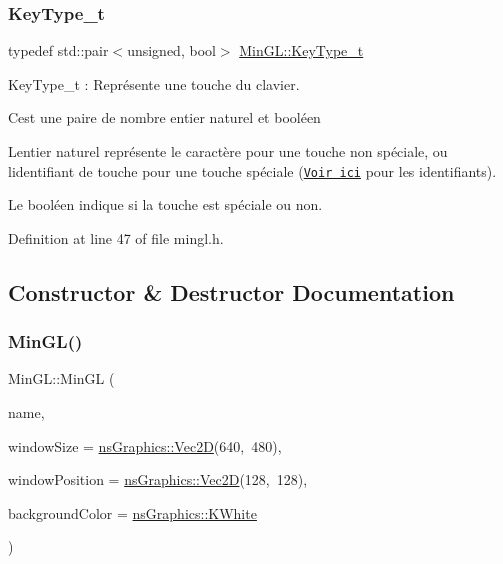 \subsubsection{\texorpdfstring{Key\+Type\+\_\+t}{KeyType\_t}}
{\footnotesize\ttfamily typedef std\+::pair$<$unsigned, bool$>$ \hyperlink{class_min_g_l_a6e612d21ed9723c37ad91093f7b48c96}{Min\+G\+L\+::\+Key\+Type\+\_\+t}}



Key\+Type\+\_\+t \+: Représente une touche du clavier. 

C\textquotesingle{}est une paire de nombre entier naturel et booléen ~\newline
 
\begin{DoxyItemize}
\item L\textquotesingle{}entier naturel représente le caractère pour une touche non spéciale, ou l\textquotesingle{}identifiant de touche pour une touche spéciale (\href{https://www.opengl.org/resources/libraries/glut/spec3/node54.html}{\tt Voir ici} pour les identifiants).  
\item Le booléen indique si la touche est spéciale ou non.
\end{DoxyItemize}

Definition at line 47 of file mingl.\+h.



\subsection{Constructor \& Destructor Documentation}
\mbox{\label{class_min_g_l_aecc35a286d1adbcbdc76bf26df18169c}} 
\subsubsection{\texorpdfstring{Min\+G\+L()}{MinGL()}}
{\footnotesize\ttfamily Min\+G\+L\+::\+Min\+GL (\begin{DoxyParamCaption}\item[{const std\+::string \&}]{name,  }\item[{const \hyperlink{classns_graphics_1_1_vec2_d}{ns\+Graphics\+::\+Vec2D} \&}]{window\+Size = {\ttfamily \hyperlink{classns_graphics_1_1_vec2_d}{ns\+Graphics\+::\+Vec2D}(640,~480)},  }\item[{const \hyperlink{classns_graphics_1_1_vec2_d}{ns\+Graphics\+::\+Vec2D} \&}]{window\+Position = {\ttfamily \hyperlink{classns_graphics_1_1_vec2_d}{ns\+Graphics\+::\+Vec2D}(128,~128)},  }\item[{const \hyperlink{classns_graphics_1_1_r_g_b_acolor}{ns\+Graphics\+::\+R\+G\+B\+Acolor} \&}]{background\+Color = {\ttfamily \hyperlink{namespacens_graphics_a8c5fcb477a548c6ed321748ec8383bb2}{ns\+Graphics\+::\+K\+White}} }\end{DoxyParamCaption})}



